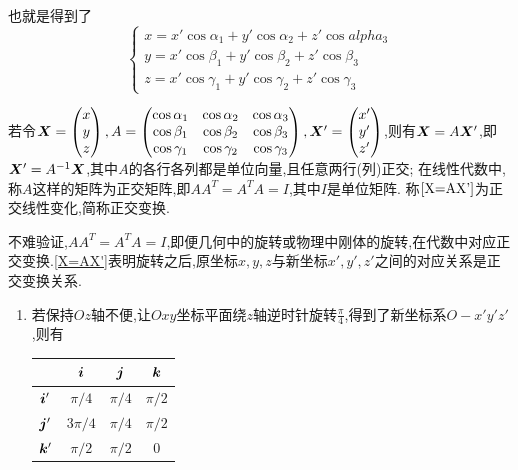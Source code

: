 \begin{solution}
也就是得到了
$$
\begin{cases}\label{X=AX'}
    x = x' \cos \alpha_1 + y' \cos \alpha_2 + z' \cos alpha_3\\
    y = x' \cos \beta_1 + y' \cos \beta_2 + z' \cos \beta_3\\
    z = x' \cos \gamma_1 + y' \cos \gamma_2 + z' \cos \gamma_3
\end{cases}
$$

若令$\bm{X} = \begin{pmatrix}
    x\\
    y\\
    z   
\end{pmatrix} , A = \begin{pmatrix}
    \cos \alpha_1 & \cos \alpha_2 & \cos \alpha_3\\
    \cos \beta_1 & \cos \beta_2 & \cos \beta_3\\
    \cos \gamma_1 & \cos \gamma_2 & \cos \gamma_3
\end{pmatrix} , \bm{X}' = \begin{pmatrix}
    x'\\
    y'\\
    z'
\end{pmatrix}$,则有$\bm{X} = A\bm{X}'$,即$\bm{X}' = A^{-1}\bm{X}$,其中$A$的各行各列都是单位向量,且任意两行(列)正交;
在线性代数中,称$A$这样的矩阵为正交矩阵,即$AA^T  = A^T A = I$,其中$I$是单位矩阵.
称$\ref{X=AX'}$为正交线性变化,简称正交变换.

不难验证,$A A^T = A^T A = I$,即便几何中的旋转或物理中刚体的旋转,在代数中对应正交变换.\ref{X=AX'}表明旋转之后,原坐标$x,y,z$与新坐标$x',y',z'$之间的对应关系是正交变换关系.

\begin{enumerate}
    \item 若保持$Oz$轴不便,让$Oxy$坐标平面绕$z$轴逆时针旋转$\frac{\pi}{4}$,得到了新坐标系$O-x'y'z'$,则有

\begin{table}[htbp]
    \centering
    \begin{tabular}{|c|c|c|c|}
        \hline
        & $\bm{i}$ & $\bm{j}$ & $\bm{k}$\\
        \hline
        $\bm{i}'$ & $\pi / 4$ & $\pi / 4$ & $\pi /2$\\
        \hline
        $\bm{j}'$ & $3\pi / 4$ & $\pi / 4$ & $\pi /2$\\
        \hline
        $\bm{k}'$ & $\pi / 2$ & $\pi / 2$ & $0$\\
        \hline
    \end{tabular}
\end{table}


\end{enumerate}
\end{solution}
